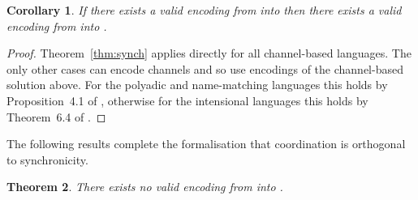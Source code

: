 \documentclass[submission,copyright,creativecommons]{eptcs}
\newtheorem{theorem}{Theorem}[section]
\newtheorem{corollary}[theorem]{Corollary}
\begin{document}
\begin{corollary}
If there exists a valid encoding from  into 
then there exists a valid encoding from  into .
\end{corollary}
\begin{proof}
Theorem~\ref{thm:synch} applies directly for all channel-based languages.
The only other cases can encode channels and so use encodings of the channel-based solution above.
For the polyadic and name-matching languages this holds by Proposition~4.1 of \cite{G:IC08},
otherwise for the intensional languages this holds by Theorem~6.4 of \cite{givenwilson:hal-01026301}.
\end{proof}

The following results complete the formalisation that coordination is orthogonal to synchronicity.

\begin{theorem}
\label{thm:no_synch_2_asynch}
There exists no valid encoding from  into .
\end{theorem}
\end{document}
